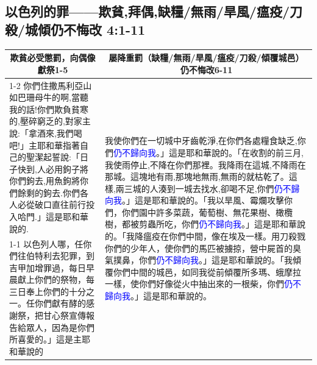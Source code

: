 \subsection{以色列的罪——欺貧,拜偶,缺糧/無雨/旱風/瘟疫/刀殺/城傾仍不悔改 4:1-11}
\begin{table}[H]
\centering 
\begin{tabular}{p{19.8em}|p{}}    \toprule 
\multicolumn{1}{c|}{欺貧必受懲罰，向偶像獻祭1-5}&\multicolumn{1}{c}{屡降重罰（缺糧/無雨/旱風/瘟疫/刀殺/傾覆城邑）仍不悔改6-11}\\\cline{1-2}
你們住撒馬利亞山如巴珊母牛的啊,當聽我的話!你們欺負貧寒的,壓碎窮乏的,對家主說:「拿酒來,我們喝吧!」主耶和華指著自己的聖潔起誓說:「日子快到,人必用鉤子將你們鉤去,用魚鉤將你們餘剩的鉤去.你們各人必從破口直往前行投入哈門.」這是耶和華說的.
&\multirow{2}{29.3em}{我使你們在一切城中牙齒乾淨,在你們各處糧食缺乏,你們\textcolor{blue}{仍不歸向我}。」這是耶和華說的。「在收割的前三月,我使雨停止,不降在你們那裡。我降雨在這城,不降雨在那城。這塊地有雨,那塊地無雨,無雨的就枯乾了。這樣,兩三城的人湊到一城去找水,卻喝不足,你們\textcolor{blue}{仍不歸向我}。」這是耶和華說的。「我以旱風、霉爛攻擊你們，你們園中許多菜蔬，葡萄樹、無花果樹、橄欖樹，都被剪蟲所吃，你們\textcolor{blue}{仍不歸向我}。」這是耶和華說的。「我降瘟疫在你們中間，像在埃及一樣。用刀殺戮你們的少年人，使你們的馬匹被擄掠，營中屍首的臭氣撲鼻，你們\textcolor{blue}{仍不歸向我}。」這是耶和華說的。「我傾覆你們中間的城邑，如同我從前傾覆所多瑪、蛾摩拉一樣，使你們好像從火中抽出來的一根柴，你們\textcolor{blue}{仍不歸向我}。」這是耶和華說的。}\\\cline{1-1}
以色列人哪，任你們往伯特利去犯罪，到吉甲加增罪過，每日早晨獻上你們的祭物，每三日奉上你們的十分之一。任你們獻有酵的感謝祭，把甘心祭宣傳報告給眾人，因為是你們所喜愛的。」這是主耶和華說的&\\ \bottomrule
\end{tabular} 
\end{table}


